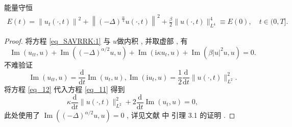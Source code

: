 能量守恒
\begin{align}\label{eq_SAVRRK:9}
	E(t)=\left\|u_{t}(\cdot , t)\right\|^{2}+\left\|(-\Delta)^{\frac{\alpha}{4}} u(\cdot , t)\right\|^{2}+\frac{\beta}{2}\|u(\cdot , t)\|_{L^{4}}^{4} \equiv E(0) , \quad t \in(0 , T] . 
	\end{align}

\begin{proof}
	将方程 \eqref{eq_SAVRRK:1} 与 $u$做内积 , 并取虚部 , 有
\begin{equation}
\operatorname{Im}\left(u_{t t} , u\right)+\operatorname{Im}\left((-\Delta)^{\alpha / 2} u , u\right)+\operatorname{Im}\left(\mathrm{i} \kappa u_{t} , u\right)+\operatorname{Im}\left(\beta|u|^{2} u , u\right)=0  . 
\label{eq_11}\end{equation}
不难验证
\begin{equation}
\operatorname{Im}\left(u_{t t} , u\right)=\frac{\mathrm{d}}{\mathrm{d} t} \operatorname{Im}\left(u_{t} , u\right) , \operatorname{Im}\left(\mathrm{i} u_{t} , u\right)=\frac{1}{2} \frac{\mathrm{d}}{\mathrm{d} t}\|u(\cdot , t)\|_{L^{2}}^{2}  . 
\label{eq_12}\end{equation}
将方程 \eqref{eq_12} 代入方程 \eqref{eq_11} 得到
\begin{equation}
\kappa \frac{\mathrm{d}}{\mathrm{d} t}\|u(\cdot , t)\|_{L^{2}}^{2}+2 \frac{\mathrm{d}}{\mathrm{d} t} \operatorname{Im}\left(u_{t} , u\right)=0 , 
\label{eq_13}\end{equation}
此处使用了 $\operatorname{Im}\left((-\Delta)^{\alpha / 2} u , u\right)=0$ , 
详见文献 \citep{guoExistenceGlobalSmooth2008}中 引理 3.1 的证明 . 


\end{proof}
